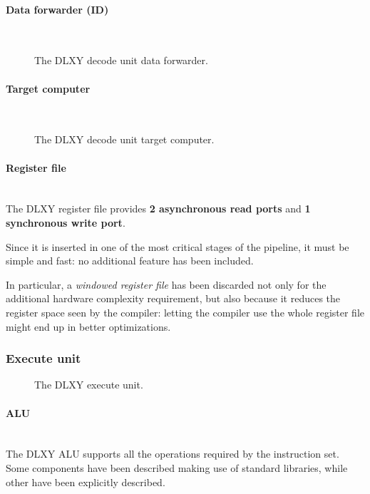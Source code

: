 \paragraph{Data forwarder (ID)} \mbox{} \\
\begin{figure}[H]
	\centering
	\caption{The DLXY decode unit data forwarder.}
	\label{fig:id_fwd}
\end{figure}
\paragraph{Target computer} \mbox{} \\
\begin{figure}[H]
	\centering
	\caption{The DLXY decode unit target computer.}
	\label{fig:target_computer}
\end{figure}
\paragraph{Register file} \mbox{} \\
The DLXY register file provides \textbf{2 asynchronous read ports} and
\textbf{1 synchronous write port}.

\bigskip
Since it is inserted in one of the most critical stages of the pipeline, it must
be simple and fast: no additional feature has been included.

In particular, a \textit{windowed register file} has been discarded not only for
the additional hardware complexity requirement, but also because it reduces the
register space seen by the compiler: letting the compiler use the whole register
file might end up in better optimizations.
\subsubsection{Execute unit}
\begin{figure}[H]
	\centering
	\caption{The DLXY execute unit.}
	\label{fig:execute_unit}
\end{figure}

\paragraph{ALU} \mbox{} \\
The DLXY ALU supports all the operations required by the instruction set.
Some components have been described making use of standard libraries, while
other have been explicitly described.


